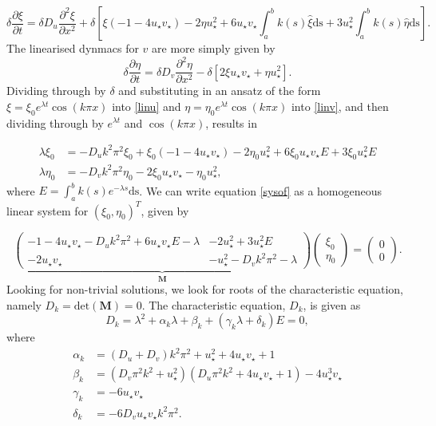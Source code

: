 \begin{equation}\label{linu}
  \delta \frac{\partial \xi}{\partial t}=\delta D_u\frac{\partial^2\xi}{\partial x^2}+\delta\left[\xi(-1-4u_\star v_\star)-2\eta u_\star^2 +6u_\star v_\star\int_a^bk(s)\hat{\xi}\text{ds}+3u_\star^2\int_a^bk(s)\hat{\eta}\text{ds}\right].
\end{equation}
The linearised dynmacs for $v$ are more simply given by
\begin{equation}\label{linv}
\delta \frac{\partial\eta}{\partial t}=\delta D_v\frac{\partial^2\eta}{\partial x^2}-\delta\left[2\xi u_\star v_\star+\eta u_\star^2\right].
\end{equation}
Dividing through by $\delta$ and substituting in an ansatz of the form $\xi=\xi_0e^{\lambda t}\cos(k\pi x)$ \cite{yigaffneyli} into \eqref{linu} and $\eta=\eta_0e^{\lambda t}\cos(k\pi x)$ into \eqref{linv}, and then dividing through by $e^{\lambda t}$ and $\cos(k\pi x)$, results in

\begin{equation}\label{sysof}
  \begin{split}
\lambda\xi_0&=-D_uk^2\pi^2\xi_0+\xi_0(-1-4u_\star v_\star)-2\eta_0u_\star^2+6\xi_0u_\star v_\star E+3\xi_0u_\star^2E \\
\lambda\eta_0&=-D_vk^2\pi^2\eta_0-2\xi_0u_\star v_\star-\eta_0u_\star^2,
\end{split}
\end{equation}
where $E=\int_a^bk(s)e^{-\lambda s}\text{ds}$. We can write equation \eqref{sysof} as a homogeneous linear system for $(\xi_0,\eta_0)^T$, given by

\begin{equation}
\underbrace{\begin{pmatrix}-1-4u_\star v_\star-D_uk^2\pi^2+6u_\star v_\star E-\lambda&-2u_\star^2+3u_\star^2E\\-2u_\star v_\star&-u_\star^2-D_vk^2\pi^2-\lambda \end{pmatrix}}_{\textbf{M}}\begin{pmatrix}\xi_0\\\eta_0\end{pmatrix}=\begin{pmatrix}0\\0\end{pmatrix}.
\end{equation}
Looking for non-trivial solutions, we look for roots of the characteristic equation, namely $D_k=\text{det}(\textbf{M})=0$. The characteristic equation, $D_k$, is given as
\begin{equation}\label{characdist}
  D_k=\lambda^2+\alpha_k\lambda+\beta_k+(\gamma_k\lambda+\delta_k)E=0,
\end{equation}
where
\begin{align}
\alpha_k&=(D_u+D_v)k^2\pi^2+u_\star^2+4u_\star v_\star+1\\
\beta_k&=(D_v\pi^2k^2+u_\star^2)(D_u\pi^2k^2+4u_\star v_\star+1)-4u_\star^3v_\star\\
\gamma_k&=-6u_\star v_\star\\
\delta_k&=-6D_vu_\star v_\star k^2\pi^2.
\end{align}

